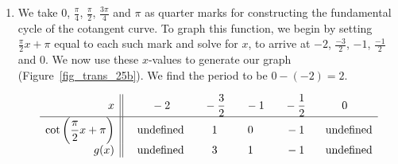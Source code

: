 \begin{example}
\begin{enumerate}
\item We take $0$, $\frac{\pi}{4}$, $\frac{\pi}{2}$, $\frac{3\pi}{4}$ and $\pi$ as quarter marks for constructing the fundamental cycle of the cotangent curve.  To graph this function, we begin by setting $\frac{\pi}{2} x + \pi$ equal to each such mark and solve for $x$, to arrive at $-2$, $\frac{-3}{2}$, $-1$, $\frac{-1}{2}$ and $0$. We now use these $x$-values to generate our graph (Figure~\ref{fig_trans_25b}). We find the period to be $0 - (-2) = 2$. 

\renewcommand{\arraystretch}{2}
\[ \begin{array}{r||ccccc}  
x         & \hphantom{-}-2  & \hphantom{-}-\dfrac{3}{2}  & \hphantom{-}-1  &  \hphantom{-}-\dfrac{1}{2} & 0  \\[0.1cm] \hline 
\cot\left(\dfrac{\pi}{2}x+\pi\right)  &  \hphantom{-}\text{undefined}  & \hphantom{-}1 & 0  &  \hphantom{-}-1 & \hphantom{-}\text{undefined} \\
g(x)  &  \hphantom{-}\text{undefined}  & \hphantom{-}3 & 1  &  \hphantom{-}-1 & \hphantom{-}\text{undefined} \\
\end{array} \]
\renewcommand{\arraystretch}{1}



\end{enumerate}


\end{example}
